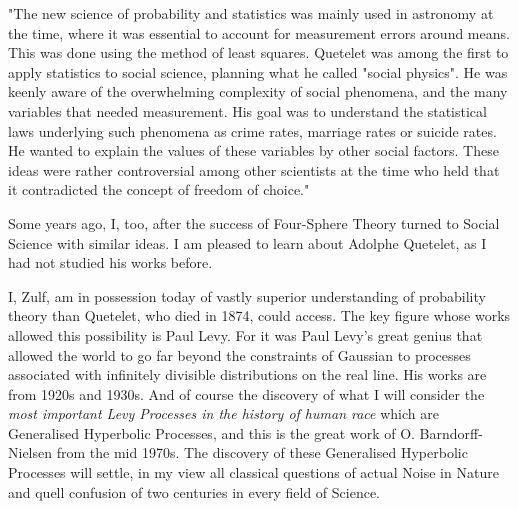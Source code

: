 \documentclass{amsart}
\begin{document}
"The new science of probability and statistics was mainly used in astronomy at the time, where it was essential to account for measurement errors around means. This was done using the method of least squares. Quetelet was among the first to apply statistics to social science, planning what he called "social physics". He was keenly aware of the overwhelming complexity of social phenomena, and the many variables that needed measurement. His goal was to understand the statistical laws underlying such phenomena as crime rates, marriage rates or suicide rates. He wanted to explain the values of these variables by other social factors. These ideas were rather controversial among other scientists at the time who held that it contradicted the concept of freedom of choice."

Some years ago, I, too, after the success of Four-Sphere Theory turned to Social Science with similar ideas.  I am pleased to learn about Adolphe Quetelet, as I had not studied his works before.

I, Zulf, am in possession today of vastly superior understanding of probability theory than Quetelet, who died in 1874, could access.  The key figure whose works allowed this possibility is Paul Levy.  For it was Paul Levy's great genius that allowed the world to go far beyond the constraints of Gaussian to processes associated with infinitely divisible distributions on the real line.  His works are from 1920s and 1930s.  And of course the discovery of what I will consider the {\em most important Levy Processes in the history of human race} which are Generalised Hyperbolic Processes, and this is the great work of O. Barndorff-Nielsen from the mid 1970s.  The discovery of these Generalised Hyperbolic Processes will settle, in my view all classical questions of actual Noise in Nature and quell confusion of two centuries in every field of Science.


\begin{thebibliography}{CCCC}
\end{thebibliography}
\end{document}
